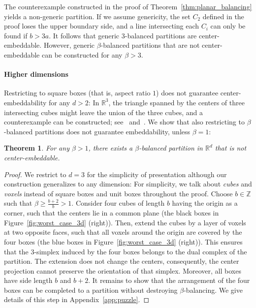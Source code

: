 \documentclass[12pt]{article}
\newcommand{\R}{\mathbb{R}}
\newcommand{\Z}{\mathbb{Z}}
\newtheorem{theorem}{Theorem}
\begin{document}
The counterexample constructed in the proof of Theorem~\ref{thm:planar_balancing}
yields a non-generic partition. If we assume genericity, the set $C_2$ defined in the proof
loses the upper boundary side, and a line intersecting each $C_i$ can only be found if $b>3a$.
It follows that generic $3$-balanced partitions are center-embeddable. 
However, generic $\beta$-balanced partitions that are not center-embeddable 
can be constructed for any $\beta>3$.

\paragraph{Higher dimensions} Restricting to square boxes (that is, aspect ratio $1$) 
does not guarantee
center-embeddability for any $d>2$: In $\R^3$, the triangle spanned by the centers
of three intersecting cubes might leave the union of the three cubes, and a counterexample
can be constructed; see~\cite{bek-computing} and~\cite{ek-freudenthal}.
We show that also restricting to $\beta$-balanced partitions does not guarantee embeddability,
unless $\beta=1$:


\begin{theorem}\label{thm:beta_balanced_high}
For any $\beta>1$, there exists a $\beta$-balanced partition in $\R^d$ that is not center-embeddable.
\end{theorem}
\begin{proof}
We restrict to $d=3$ for the simplicity of presentation
although our construction generalizes to any dimension:
For simplicity, we talk about \emph{cubes} and \emph{voxels}
instead of square boxes and unit boxes throughout the proof.
Choose $b\in\Z$ such that $\beta\geq \frac{b+2}{b}>1$. 
Consider four cubes of length $b$ having the origin as a corner,
such that the centers lie in a common plane 
(the black boxes in Figure~\ref{fig:worst_case_3d} (right)).
Then, extend the cubes by a layer of voxels at two opposite faces, such that 
all voxels around the origin are covered by the four boxes
(the blue boxes in Figure~\ref{fig:worst_case_3d} (right)). 
This ensures that the $3$-simplex induced by the four boxes belongs to the dual complex
of the partition.
The extension does not change the centers, consequently,
the center projection cannot preserve the orientation of that simplex.
Moreover, all boxes have side length $b$ and $b+2$. It remains to show that
the arrangement of the four boxes can be completed to a partition without
destroying $\beta$-balancing. We give details of this step
in Appendix~\ref{app:puzzle}.
\end{proof}
\end{document}
